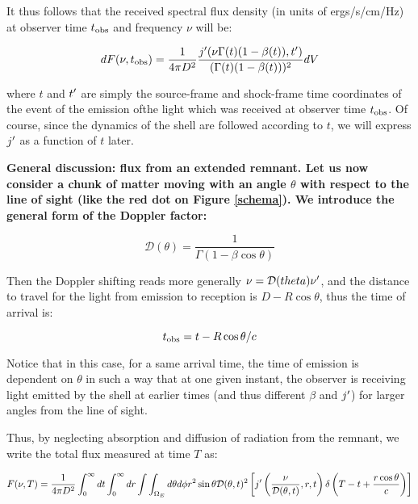 It thus follows that the received spectral flux density (in units of ergs/s/cm/Hz) at observer time $t_{\mathrm{obs}}$ and frequency $\nu$ will be:

\begin{equation}dF(\nu, t_{\mathrm{obs}}) = \frac{1}{4\pi D^2} \frac{j^{\prime}(\nu \Gamma(t)(1 - \beta(t)), t^{\prime})}{(\Gamma(t)(1 - \beta(t)))^2}dV\end{equation}

where $t$ and $t^{\prime}$ are simply the source-frame and shock-frame time coordinates of the event of the emission ofthe light which was received at observer time $t_{\mathrm{obs}}$. Of course, since the dynamics of the shell are followed according to $t$, we will express $j^{\prime}$ as a function of $t$ later.

\bf{General discussion: flux from an extended remnant.} Let us now consider a chunk of matter moving with an angle $\theta$ with respect to the line of sight (like the red dot on Figure \ref{schema}). We introduce the general form of the Doppler factor:

\begin{equation}\label{doppler}
\mathcal{D}(\theta) = \frac{1}{\Gamma(1 - \beta \cos \theta)}
\end{equation}

Then the Doppler shifting reads more generally $\nu = \mathcal{D}(theta)\nu^{\prime}$, and the distance to travel for the light from emission to reception is $D - R \cos \theta$, thus the time of arrival is:

\begin{equation}
t_{\mathrm{obs}} = t - R \cos \theta / c
\end{equation}

Notice that in this case, for a same arrival time, the time of emission is dependent on $\theta$ in such a way that at one given instant, the observer is receiving light emitted by the shell at earlier times (and thus different $\beta$ and $j^{\prime}$) for larger angles from the line of sight.

Thus, by neglecting absorption and diffusion of radiation from the remnant, we write the total flux measured at time $T$ as:


\begin{equation}\label{in}
    F(\nu, T) = \frac{1}{4\pi D ^ 2}\int_0^{\infty} dt \int_0^\infty dr \int \int_{\Omega_E} d\theta d\phi r^2 \sin \theta \mathcal{D}(\theta, t)^2 \left[ j^{\prime}\left(\frac{\nu}{\mathcal{D}(\theta, t)}, r, t\right) \delta\left(T - t + \frac{r\cos\theta}{c}\right) \right]
\end{equation}


